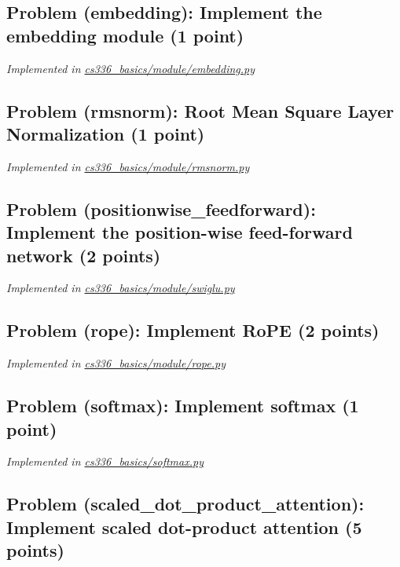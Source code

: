 \documentclass[letterpaper]{article}
\begin{document}
\subsection{Problem (embedding): Implement the embedding module (1 point)}

\textit{Implemented in  \href{https://github.com/echung32/ece405-assignment1-basics/blob/main/cs336_basics/module/embedding.py}{cs336\_basics/module/embedding.py}}

\subsection{Problem (rmsnorm): Root Mean Square Layer Normalization (1 point)}

\textit{Implemented in  \href{https://github.com/echung32/ece405-assignment1-basics/blob/main/cs336_basics/module/rmsnorm.py}{cs336\_basics/module/rmsnorm.py}}

\subsection{Problem (positionwise\_feedforward): Implement the position-wise feed-forward network (2 points)}

\textit{Implemented in  \href{https://github.com/echung32/ece405-assignment1-basics/blob/main/cs336_basics/module/swiglu.py}{cs336\_basics/module/swiglu.py}}

\subsection{Problem (rope): Implement RoPE (2 points)}

\textit{Implemented in  \href{https://github.com/echung32/ece405-assignment1-basics/blob/main/cs336_basics/module/rope.py}{cs336\_basics/module/rope.py}}

\subsection{Problem (softmax): Implement softmax (1 point)}

\textit{Implemented in  \href{https://github.com/echung32/ece405-assignment1-basics/blob/main/cs336_basics/softmax.py}{cs336\_basics/softmax.py}}

\subsection{Problem (scaled\_dot\_product\_attention): Implement scaled dot-product attention (5 points)}
\end{document}
